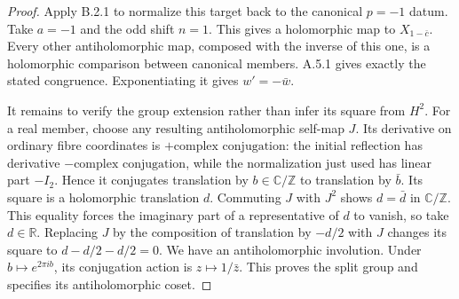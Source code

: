 \begin{proof}
Apply B.2.1 to normalize this target back to the canonical $p=-1$ datum. Take $a=-1$ and the odd shift $n=1$. This gives a holomorphic map to $X_{1-\bar c}$. Every other antiholomorphic map, composed with the inverse of this one, is a holomorphic comparison between canonical members. A.5.1 gives exactly the stated congruence. Exponentiating it gives $w'=-\bar w$.

It remains to verify the group extension rather than infer its square from $H^2$. For a real member, choose any resulting antiholomorphic self-map $J$. Its derivative on ordinary fibre coordinates is $+\text{complex conjugation}$: the initial reflection has derivative $-\text{complex conjugation}$, while the normalization just used has linear part $-I_2$. Hence it conjugates translation by $b\in\mathbb C/\mathbb Z$ to translation by $\bar b$. Its square is a holomorphic translation $d$. Commuting $J$ with $J^2$ shows $d=\bar d$ in $\mathbb C/\mathbb Z$. This equality forces the imaginary part of a representative of $d$ to vanish, so take $d\in\mathbb R$. Replacing $J$ by the composition of translation by $-d/2$ with $J$ changes its square to $d-d/2-d/2=0$. We have an antiholomorphic involution. Under $b\mapsto e^{2\pi ib}$, its conjugation action is $z\mapsto1/\bar z$. This proves the split group and specifies its antiholomorphic coset.
\end{proof}
